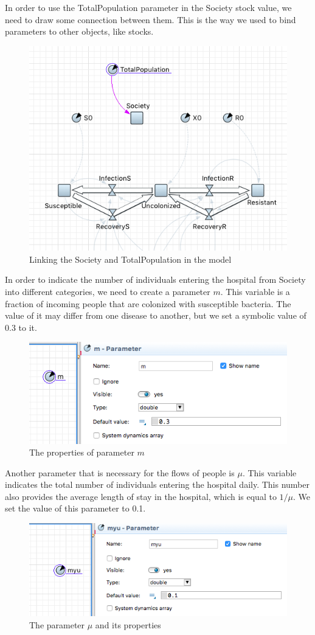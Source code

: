 In order to use the TotalPopulation parameter in the Society stock value, we need to draw some connection between them. This is the way we used to bind parameters to other objects, like stocks.

\begin{figure}[H]
  \centering
  \includegraphics[height=0.5\textwidth]{img/screens/society/society3}
  \caption{Linking the Society and TotalPopulation in the model}
\end{figure}

In order to indicate the number of individuals entering the hospital from Society into different categories, we need to create a parameter $m$. This variable is a fraction of incoming people that are colonized with susceptible bacteria. The value of it may differ from one disease to another, but we set a symbolic value of 0.3 to it.

\begin{figure}[H]
  \centering
  \includegraphics[height=0.3\textwidth]{img/screens/society/society4}
  \caption{The properties of parameter $m$}
\end{figure}

Another parameter that is necessary for the flows of people is $\mu$. This variable indicates the total number of individuals entering the hospital daily. This number also provides the average length of stay in the hospital, which is equal to $1/\mu$. We set the value of this parameter to 0.1.

\begin{figure}[H]
  \centering
  \includegraphics[height=0.3\textwidth]{img/screens/society/society6}
  \caption{The parameter $\mu$ and its properties}
\end{figure}

